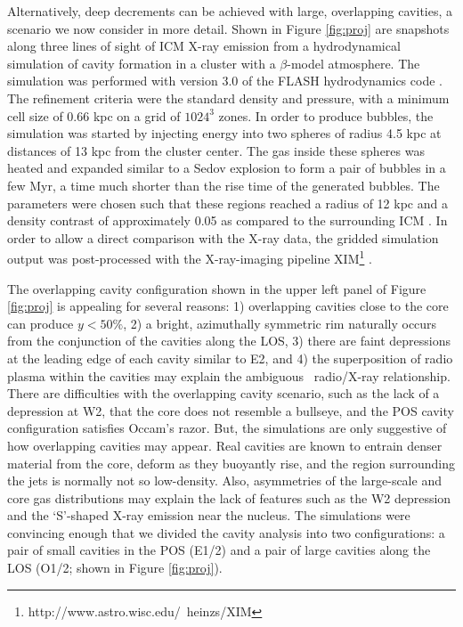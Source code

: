 \documentclass{emulateapj}
\begin{document}
Alternatively, deep decrements can be achieved with large, overlapping
cavities, a scenario we now consider in more detail. Shown in Figure
\ref{fig:proj} are snapshots along three lines of sight of ICM X-ray
emission from a hydrodynamical simulation of cavity formation in a
cluster with a $\beta$-model atmosphere. The simulation was performed
with version 3.0 of the {\textsc{FLASH}} hydrodynamics code
\citep{flash}. The refinement criteria were the standard density and
pressure, with a minimum cell size of 0.66 kpc on a grid of $1024^3$
zones. In order to produce bubbles, the simulation was started by
injecting energy into two spheres of radius 4.5 kpc at distances of 13
kpc from the cluster center. The gas inside these spheres was heated
and expanded similar to a Sedov explosion to form a pair of bubbles in
a few Myr, a time much shorter than the rise time of the generated
bubbles. The parameters were chosen such that these regions reached a
radius of 12 kpc and a density contrast of approximately 0.05 as
compared to the surrounding ICM \citep[see][]{2009arXiv0909.1805S}. In
order to allow a direct comparison with the X-ray data, the gridded
simulation output was post-processed with the X-ray-imaging pipeline
{\textsc{XIM}}\footnote{http://www.astro.wisc.edu/~heinzs/XIM}
\citep{2009arXiv0903.0043H}.

The overlapping cavity configuration shown in the upper left panel of
Figure \ref{fig:proj} is appealing for several reasons: 1) overlapping
cavities close to the core can produce $y < 50\%$, 2) a bright,
azimuthally symmetric rim naturally occurs from the conjunction of the
cavities along the LOS, 3) there are faint depressions at the leading
edge of each cavity similar to E2, and 4) the superposition of radio
plasma within the cavities may explain the ambiguous \rxj\ radio/X-ray
relationship. There are difficulties with the overlapping cavity
scenario, such as the lack of a depression at W2, that the core does
not resemble a bullseye, and the POS cavity configuration satisfies
Occam's razor. But, the simulations are only suggestive of how
overlapping cavities may appear. Real cavities are known to entrain
denser material from the core, deform as they buoyantly rise, and the
region surrounding the jets is normally not so low-density. Also,
asymmetries of the large-scale and core gas distributions may explain
the lack of features such as the W2 depression and the `S'-shaped
X-ray emission near the nucleus. The simulations were convincing
enough that we divided the cavity analysis into two configurations: a
pair of small cavities in the POS (E1/2) and a pair of large cavities
along the LOS (O1/2; shown in Figure \ref{fig:proj}).
\end{document}
